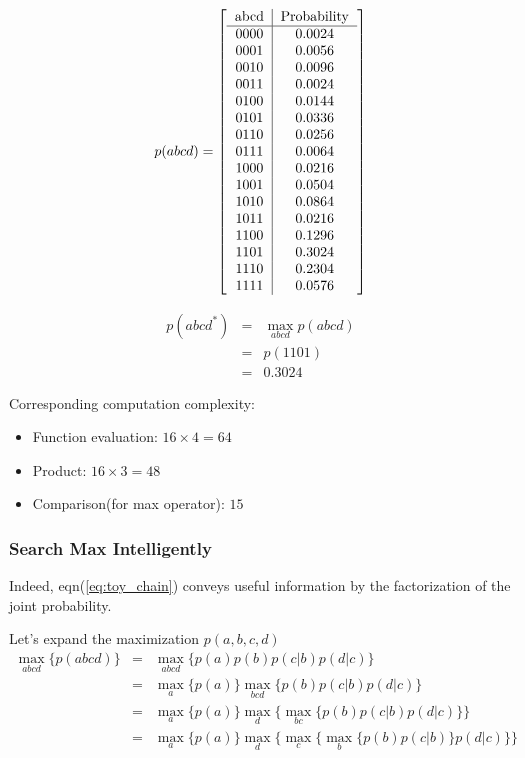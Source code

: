 \begin{equation}
p(abcd)=\left[ 
\begin{tabular}{c|c}
abcd & Probability \\
\hline
  0000 & 0.0024 \\
  0001 & 0.0056 \\ 
  0010 & 0.0096 \\ 
  0011 & 0.0024 \\ 
  0100 & 0.0144 \\ 
  0101 & 0.0336 \\ 
  0110 & 0.0256 \\ 
  0111 & 0.0064 \\ 
  1000 & 0.0216 \\ 
  1001 & 0.0504 \\ 
  1010 & 0.0864 \\ 
  1011 & 0.0216 \\ 
  1100 & 0.1296 \\ 
  1101 & 0.3024 \\ 
  1110 & 0.2304 \\ 
  1111 & 0.0576 \\ 
\end{tabular} \right]
\end{equation}

\begin{eqnarray}
	p(abcd^*) &=& \max_{abcd}{p(abcd)} \\
	&=& p(1101) \\ 
	&=& 0.3024 
\end{eqnarray}

Corresponding computation complexity:
\begin{itemize}
	\item Function evaluation: $16 \times 4 = 64$
	\item Product: $16 \times 3 = 48$
	\item Comparison(for max operator): $15$
\end{itemize}

\subsubsection{Search Max Intelligently}
Indeed, eqn(\ref{eq:toy_chain}) conveys useful information by the 
factorization of the joint probability. 

Let's expand the maximization $p(a,b,c,d)$
\begin{eqnarray}
\max_{abcd} \{ p(abcd) \} &=& \max_{abcd} \{ p(a)p(b)p(c|b)p(d|c) \} \\
&=& \max_{a} \{ p(a) \} \max_{bcd} \{ p(b)p(c|b)p(d|c) \}  \\
&=& \max_{a} \{ p(a) \} \max_{d} \{ \max_{bc} \{p(b)p(c|b)p(d|c)\} \}  \\
&=& \max_{a} \{ p(a) \} \max_{d} \{ \max_{c} \{\max_{b} \{p(b)p(c|b) \} p(d|c)\} \}  
\end{eqnarray}

